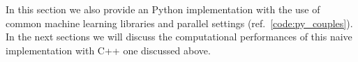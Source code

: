 \documentclass{standalone}
\begin{document}
In this section we also provide an  \textsf{Python} implementation with the use of common machine learning libraries and parallel settings (ref.~\ref{code:py_couples}).
In the next sections we will discuss the computational performances of this naive implementation with \textsf{C++} one discussed above.
\end{document}
